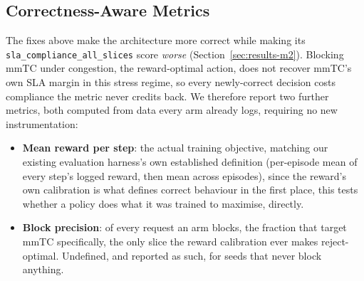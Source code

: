 \documentclass[journal]{IEEEtran}
\begin{document}
\subsection{Correctness-Aware Metrics}
\label{sec:correctness-metrics}
The fixes above make the architecture more correct while making its
\texttt{sla\_compliance\_all\_slices} score \emph{worse}
(Section~\ref{sec:results-m2}). Blocking mmTC under congestion, the
reward-optimal action, does not recover mmTC's own SLA margin in this
stress regime, so every newly-correct decision costs compliance the
metric never credits back. We therefore report two further metrics,
both computed from data every arm already logs, requiring no new
instrumentation:
\begin{itemize}
\item \textbf{Mean reward per step}: the actual training objective,
  matching our existing evaluation harness's own established
  definition (per-episode mean of every step's logged reward, then
  mean across episodes), since the reward's own calibration is what
  defines correct behaviour in the first place, this tests whether a
  policy does what it was trained to maximise, directly.
\item \textbf{Block precision}: of every request an arm blocks, the
  fraction that target mmTC specifically, the only slice the reward
  calibration ever makes reject-optimal. Undefined, and reported as
  such, for seeds that never block anything.
\end{itemize}
\end{document}
